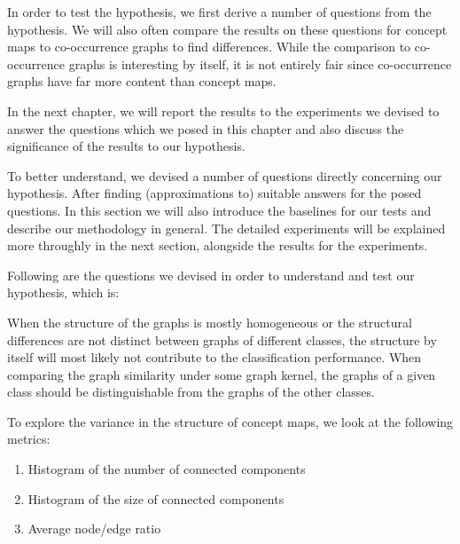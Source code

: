 In order to test the hypothesis, we first derive a number of questions from the hypothesis.
We will also often compare the results on these questions for concept maps to co-occurrence graphs to find differences. While the comparison to co-occurrence graphs is interesting by itself, it is not entirely fair since co-occurrence graphs have far more content than concept maps.

In the next chapter, we will report the results to the experiments we devised to answer the questions which we posed in this chapter and also discuss the significance of the results to our hypothesis.


To better understand, we devised a number of questions directly concerning our hypothesis.
After finding (approximations to) suitable answers for the posed questions.
In this section we will also introduce the baselines for our tests and describe our methodology in general.
The detailed experiments will be explained more throughly in the next section, alongside the results for the experiments.

Following are the questions we devised in order to understand and test our hypothesis, which is:
\begin{quote}\hypothesis\end{quote}


When the structure of the graphs is mostly homogeneous or the structural differences are not distinct between graphs of different classes, the structure by itself will most likely not contribute to the classification performance.
When comparing the graph similarity under some graph kernel, the graphs of a given class should be distinguishable from the graphs of the other classes.

To explore the variance in the structure of concept maps, we look at the following metrics:
\begin{enumerate}
    \item{Histogram of the number of connected components}
    \item{Histogram of the size of connected components}
    \item{Average node/edge ratio}
\end{enumerate}

